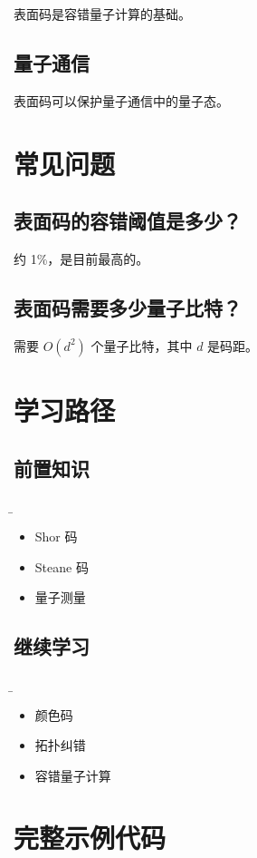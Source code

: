 \documentclass[12pt,a4paper]{article}
\begin{document}
表面码是容错量子计算的基础。

\subsection{量子通信}

表面码可以保护量子通信中的量子态。

\section{常见问题}

\subsection{表面码的容错阈值是多少？}

约 1\%，是目前最高的。

\subsection{表面码需要多少量子比特？}

需要 $O(d^2)$ 个量子比特，其中 $d$ 是码距。

\section{学习路径}

\subsection{前置知识}
\b\begin{itemize}
  \item Shor 码
  \item Steane 码
  \item 量子测量
\end{itemize}

\subsection{继续学习}
\b\begin{itemize}
  \item 颜色码
  \item 拓扑纠错
  \item 容错量子计算
\end{itemize}

\section{完整示例代码}
\end{document}
